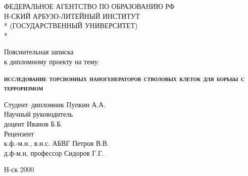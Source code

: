 \begin{titlepage}
	\newpage
	
	\begin{center}
		ФЕДЕРАЛЬНОЕ АГЕНТСТВО ПО ОБРАЗОВАНИЮ РФ \\
		\vspace{1cm}
		Н-СКИЙ АРБУЗО-ЛИТЕЙНЫЙ ИНСТИТУТ \\*
		(ГОСУДАРСТВЕННЫЙ УНИВЕРСИТЕТ) \\*
		\hrulefill
	\end{center}
	
	
	\vspace{8em}
	
	\begin{center}
		\Large Пояснительная записка \\ к дипломному проекту на тему:
	\end{center}
	
	\vspace{2.5em}
	
	\begin{center}
		\textsc{\textbf{исследование торсионных наногенераторов \linebreak стволовых клеток для борьбы с терроризмом}}
	\end{center}
	
	\vspace{6em}
	
	\begin{flushleft}
		Студент--дипломник \hrulefill Пупкин А.А. \\
		\vspace{1.5em}
		Научный руководитель \\
		доцент \hrulefill Иванов Б.Б.\\
		\vspace{1.5em}
		Рецензент \\
		к.ф.-м.н., в.н.с. АБВГ \hrulefill Петров В.В.\\
		\vspace{1.5em}
		д.ф-м.н, профессор \hrulefill Сидоров Г.Г.
	\end{flushleft}
	
	\vspace{\fill}
	
	\begin{center}
		Н-ск 2000
	\end{center}
	
\end{titlepage}